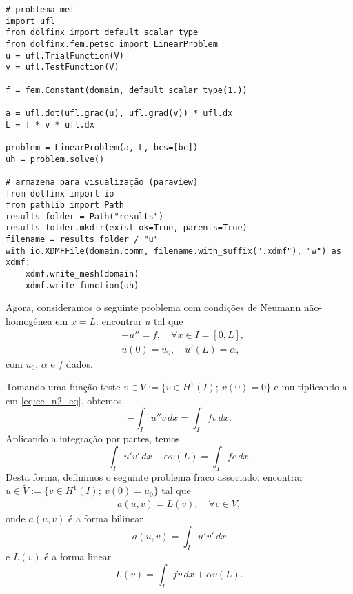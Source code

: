 \begin{ex}
\begin{lstlisting}[caption=ex\_mef1d\_neumann.py]
# problema mef
import ufl
from dolfinx import default_scalar_type
from dolfinx.fem.petsc import LinearProblem
u = ufl.TrialFunction(V)
v = ufl.TestFunction(V)

f = fem.Constant(domain, default_scalar_type(1.))

a = ufl.dot(ufl.grad(u), ufl.grad(v)) * ufl.dx
L = f * v * ufl.dx

problem = LinearProblem(a, L, bcs=[bc])
uh = problem.solve()

# armazena para visualização (paraview)
from dolfinx import io
from pathlib import Path
results_folder = Path("results")
results_folder.mkdir(exist_ok=True, parents=True)
filename = results_folder / "u"
with io.XDMFFile(domain.comm, filename.with_suffix(".xdmf"), "w") as xdmf:
    xdmf.write_mesh(domain)
    xdmf.write_function(uh)

\end{lstlisting}

\end{ex}

Agora, consideramos o seguinte problema com condições de Neumann não-homogênea em $x=L$: encontrar $u$ tal que
\begin{align}
  &-u'' = f,\quad \forall x\in I=[0, L],\label{eq:cc_n2_eq}\\
  &u(0) = u_0,\quad u'(L) = \alpha,\label{eq:cc_n2_bc}
\end{align}
com $u_0$, $\alpha$ e $f$ dados.

Tomando uma função teste $v\in V:=\{v\in H^1(I);~v(0)=0\}$ e multiplicando-a em \eqref{eq:cc_n2_eq}, obtemos
\begin{equation}
  - \int_I u''v\,dx = \int_I fv\,dx.
\end{equation}
Aplicando a integração por partes, temos
\begin{equation}
  \int_I u'v'\,dx - \alpha v(L)= \int_I fc\,dx.
\end{equation}
Desta forma, definimos o seguinte problema fraco associado: encontrar $u\in \tilde{V} := \{v\in H^1(I);~v(0)=u_0\}$ tal que
\begin{align}
  a(u,v) = L(v),\quad\forall v\in V,
\end{align}
onde $a(u,v)$ é a forma bilinear
\begin{equation}
  a(u,v) = \int_I u'v'\,dx
\end{equation}
e $L(v)$ é a forma linear
\begin{equation}
  L(v) = \int_I fv\,dx + \alpha v(L).
\end{equation}


